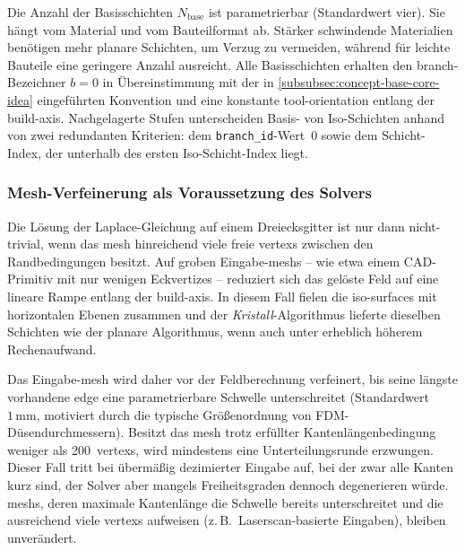                 Die Anzahl der Basisschichten $N_\text{base}$ ist parametrierbar (Standardwert vier).
                Sie hängt vom Material und vom Bauteilformat ab.
                Stärker schwindende Materialien benötigen mehr planare Schichten, um Verzug zu vermeiden, während für leichte Bauteile eine geringere Anzahl ausreicht.
                Alle Basisschichten erhalten den \gls{branch}-Bezeichner $b = 0$ in Übereinstimmung mit der in \cref{subsubsec:concept-base-core-idea} eingeführten Konvention und eine konstante \gls{tool-orientation} entlang der \gls{build-axis}.
                Nachgelagerte Stufen unterscheiden Basis- von Iso-Schichten anhand von zwei redundanten Kriterien: dem \texttt{branch\_id}-Wert~$0$ sowie dem Schicht-Index, der unterhalb des ersten Iso-Schicht-Index liegt.

            \subsubsection{Mesh-Verfeinerung als Voraussetzung des Solvers}\label{subsubsec:concept-crystal-mesh-refinement} 
                Die Lösung der Laplace-Gleichung auf einem Dreiecksgitter ist nur dann nicht-trivial, wenn das \gls{mesh} hinreichend viele freie \glspl{vertex} zwischen den Randbedingungen besitzt.
                Auf groben Eingabe-\glspl{mesh} -- wie etwa einem CAD-Primitiv mit nur wenigen Eckvertizes -- reduziert sich das gelöste Feld auf eine lineare Rampe entlang der \gls{build-axis}.
                In diesem Fall fielen die \glspl{iso-surface} mit horizontalen Ebenen zusammen und der \emph{Kristall}-Algorithmus lieferte dieselben Schichten wie der planare Algorithmus, wenn auch unter erheblich höherem Rechenaufwand.

                Das Eingabe-\gls{mesh} wird daher vor der Feldberechnung verfeinert, bis seine längste vorhandene \gls{edge} eine parametrierbare Schwelle unterschreitet (Standardwert $1\,\text{mm}$, motiviert durch die typische Größenordnung von FDM-Düsendurchmessern).
                Besitzt das \gls{mesh} trotz erfüllter Kantenlängenbedingung weniger als 200~\glspl{vertex}, wird mindestens eine Unterteilungsrunde erzwungen.
                Dieser Fall tritt bei übermäßig dezimierter Eingabe auf, bei der zwar alle Kanten kurz sind, der Solver aber mangels Freiheitsgraden dennoch degenerieren würde.
                \glspl{mesh}, deren maximale Kantenlänge die Schwelle bereits unterschreitet und die ausreichend viele \glspl{vertex} aufweisen (z.\,B.\ Laserscan-basierte Eingaben), bleiben unverändert.

